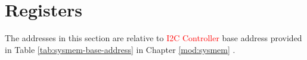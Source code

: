 \documentclass[main\_\_EN.tex]{subfiles}
\begin{document}





\clearpage
\section{Registers}

The addresses in this section are relative to \textcolor{red}{I2C Controller} base address provided in Table \ref{tab:sysmem-base-address} in Chapter \ref{mod:sysmem} \textit{}.



\end{document}

